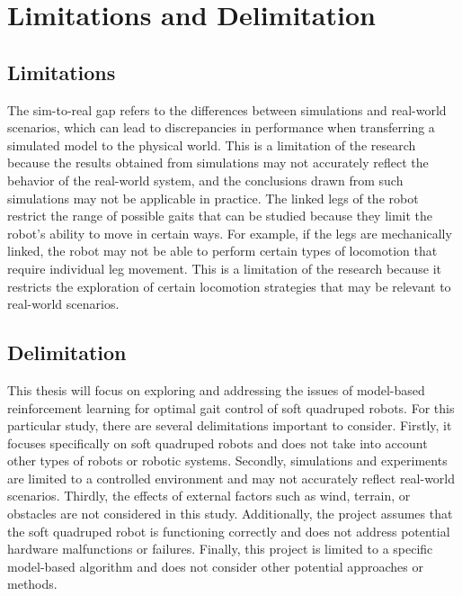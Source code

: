\section{Limitations and Delimitation}
\subsection*{Limitations}
The sim-to-real gap refers to the differences between simulations and real-world scenarios, which can lead to discrepancies in performance when transferring a simulated model to the physical world. This is a limitation of the research because the results obtained from simulations may not accurately reflect the behavior of the real-world system, and the conclusions drawn from such simulations may not be applicable in practice. The linked legs of the robot restrict the range of possible gaits that can be studied because they limit the robot's ability to move in certain ways. For example, if the legs are mechanically linked, the robot may not be able to perform certain types of locomotion that require individual leg movement. This is a limitation of the research because it restricts the exploration of certain locomotion strategies that may be relevant to real-world scenarios.

\subsection*{Delimitation}
 This thesis will focus on exploring and addressing the issues of model-based reinforcement learning for optimal gait control of soft quadruped robots. For this particular study, there are several delimitations important to consider. Firstly, it focuses specifically on soft quadruped robots and does not take into account other types of robots or robotic systems. Secondly, simulations and experiments are limited to a controlled environment and may not accurately reflect real-world scenarios. Thirdly, the effects of external factors such as wind, terrain, or obstacles are not considered in this study. Additionally, the project assumes that the soft quadruped robot is functioning correctly and does not address potential hardware malfunctions or failures. Finally, this project is limited to a specific model-based algorithm and does not consider other potential approaches or methods.
 
